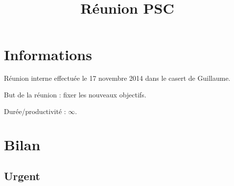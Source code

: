 \documentclass{article}
\title{Réunion PSC}
\author{}
\begin{document}
                 
\maketitle
    
\section{Informations}

Réunion interne effectuée le 17 novembre 2014 dans le casert de Guillaume.

But de la réunion : fixer les nouveaux objectifs.

Durée/productivité : $\infty$.

\section{Bilan}

\subsection*{Urgent}
\end{document}

